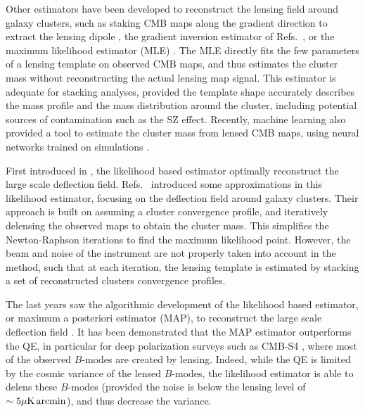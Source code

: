 \documentclass[prd, superscriptaddress, tightenlines, longbibliography, nofootinbib, eqsecnum, amsfonts, amsmath, floatfix, twocolumn, notitlepage]{revtex4-2}
\begin{document}
Other estimators have been developed to reconstruct the lensing field around galaxy clusters, such as staking CMB maps along the gradient direction to extract the lensing dipole \cite{SPT:2019qkp, Levy:2023moy}, the gradient inversion estimator of Refs.~\cite{Horowitz:2017iql, Hadzhiyska:2019cle}, or the maximum likelihood estimator (MLE) \cite{Lewis:2005fq,Baxter:2014frs, Raghunathan:2017cle}.
The MLE directly fits the few parameters of a lensing template on observed CMB maps, and thus estimates the cluster mass without reconstructing the actual lensing map signal. This estimator is adequate for stacking analyses, provided the template shape accurately describes the mass profile and the mass distribution around the cluster, including potential sources of contamination such as the SZ effect.
Recently, machine learning also provided a tool to estimate the cluster mass from lensed CMB maps, using neural networks trained on simulations \cite{Caldeira:2018ojb, Gupta:2020him, Parker:2022uxh}.

First introduced in \cite{Hirata:2002jy, Hirata:2003ka}, the likelihood based estimator optimally reconstruct the large scale deflection field.
Refs.~\cite{ Yoo:2008bf, Yoo:2010jd} introduced some approximations in this likelihood estimator, focusing on the deflection field around galaxy clusters. Their approach is built on assuming a cluster convergence profile, and iteratively delensing the observed maps to obtain the cluster mass. This simplifies the Newton-Raphson iterations to find the maximum likelihood point. However, the beam and noise of the instrument are not properly taken into account in the method, such that at each iteration, the lensing template is estimated by stacking a set of reconstructed clusters convergence profiles.

The last years saw the algorithmic development of the likelihood based estimator, or maximum a posteriori estimator (MAP), to reconstruct the large scale deflection field \cite{Carron:2017mqf,Millea:2017fyd,Millea:2020cpw, Millea:2021had,Legrand:2021qdu,Aurlien:2022tlp,Legrand:2023jne,Reinecke:2023gtp}.
It has been demonstrated that the MAP estimator outperforms the QE, in particular for deep polarization surveys such as CMB-S4 \cite{CMB-S4:2016ple}, where most of the observed $B$-modes are created by lensing. Indeed, while the QE is limited by the cosmic variance of the lensed $B$-modes, the likelihood estimator is able to delens these $B$-modes (provided the noise is below the lensing level of $\sim 5\mu\rm K \, arcmin$), and thus decrease the variance.
\end{document}
